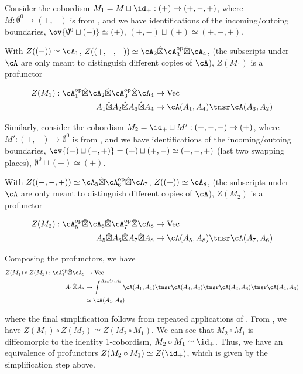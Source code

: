 \documentclass[12pt]{article}
\newcommand{\empt}[1]{{\emptyset^{#1}}}
\newcommand{\op}{{\text{op}}}
\newcommand{\hatbox}{{\hat{\boxtimes}}}
\DeclareMathOperator{\Vect}{Vec}
\begin{document}
\begin{example}
Consider the cobordism $M_1 = M \sqcup \id_+: (+) \to (+,-,+)$,
where $M: \empt{0} \to (+,-)$ is from ,
and we have identifications of the incoming/outoing boundaries,
$\ov{\empt{0} \sqcup (-)} \simeq (+)$,
$(+,-) \sqcup (+) \simeq (+,-,+)$.

With $Z((+)) \simeq \cA_1$,
$Z((+,-,+)) \simeq \cA_2 \hatbox \cA_3^\op \hatbox \cA_4$,
(the subscripts under $\cA$ are only meant to distinguish
different copies of $\cA$),
$Z(M_1)$ is a profunctor

\begin{align*}
Z(M_1) : \cA_1^\op \hatbox \cA_2 \hatbox \cA_3^\op \hatbox \cA_4
&\to \Vect
\\
A_1 \hatbox A_2 \hatbox A_3 \hatbox A_4
&\mapsto \cA(A_1,A_4) \tnsr \cA(A_3,A_2)
\end{align*}

Similarly, consider the cobordism $M_2 = \id_+ \sqcup M': (+,-,+) \to (+)$,
where $M': (+,-) \to \empt{0}$ is from ,
and we have identifications of the incoming/outoing boundaries,
$\ov{(-) \sqcup (-,+)} = (+) \sqcup (+,-) \simeq (+,-,+)$
(last two swapping places),
$\empt{0} \sqcup (+) \simeq (+)$.

With $Z((+,-,+)) \simeq \cA_5 \hatbox \cA_6^\op \hatbox \cA_7$,
$Z((+)) \simeq \cA_8$,
(the subscripts under $\cA$ are only meant to distinguish
different copies of $\cA$),
$Z(M_2)$ is a profunctor

\begin{align*}
Z(M_2) : \cA_5^\op \hatbox \cA_6 \hatbox \cA_7^\op \hatbox \cA_8
&\to \Vect
\\
A_5 \hatbox A_6 \hatbox A_7 \hatbox A_8
&\mapsto \cA(A_5,A_8) \tnsr \cA(A_7,A_6)
\end{align*}

Composing the profunctors, we have
\begin{align*}
Z(M_1) \circ Z(M_2) :
\cA_1^\op \hatbox \cA_8
&\to \Vect
\\
A_1 \hatbox A_8
&\mapsto
\int^{A_2,A_3,A_4}
\cA(A_1,A_4) \tnsr \cA(A_3,A_2) \tnsr \cA(A_2,A_8) \tnsr \cA(A_4,A_3)
\\
&\simeq \cA(A_1,A_8)
\end{align*}

where the final simplification follows from
repeated applications of .
From ,
we have $Z(M_1) \circ Z(M_2) \simeq Z(M_2 \circ M_1)$.
We can see that $M_2 \circ M_1$
is diffeomorpic to the identity 1-cobordism,
$M_2 \circ M_1 \simeq \id_+$.
Thus, we have an equivalence of profunctors
$Z(M_2 \circ M_1) \simeq Z(\id_+)$,
which is given by the simplification step above.
\end{example}
\end{document}
